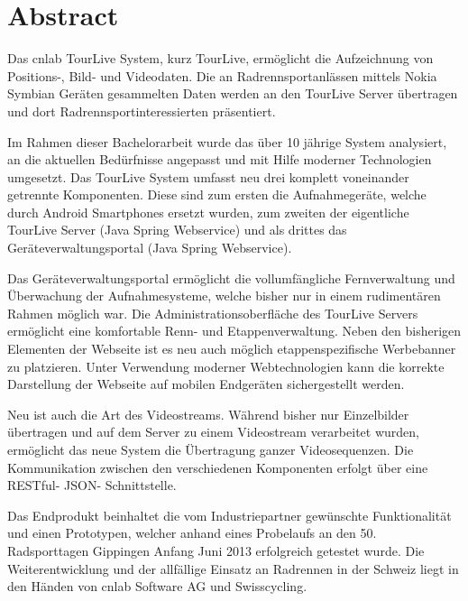 \chapter*{Abstract}
Das cnlab TourLive System, kurz TourLive, ermöglicht die Aufzeichnung von Positions-, Bild- und Videodaten. Die an Radrennsportanlässen mittels Nokia Symbian Geräten gesammelten Daten werden an den TourLive Server übertragen und dort Radrennsportinteressierten präsentiert.



Im Rahmen dieser Bachelorarbeit wurde das über 10 jährige System analysiert, an die aktuellen Bedürfnisse angepasst und mit Hilfe moderner Technologien umgesetzt. Das TourLive System umfasst neu drei komplett voneinander getrennte Komponenten. Diese sind zum ersten die Aufnahmegeräte, welche durch Android Smartphones ersetzt wurden, zum zweiten der eigentliche TourLive Server (Java Spring Webservice) und als drittes das Geräteverwaltungsportal (Java Spring Webservice). 


Das Geräteverwaltungsportal ermöglicht die vollumfängliche Fernverwaltung und Überwachung der Aufnahmesysteme, welche bisher nur in einem rudimentären Rahmen möglich war. Die Administrationsoberfläche des TourLive Servers ermöglicht eine komfortable Renn- und Etappenverwaltung. Neben den bisherigen Elementen der Webseite ist es neu auch möglich etappenspezifische Werbebanner zu platzieren. Unter Verwendung moderner Webtechnologien kann die korrekte Darstellung der Webseite auf mobilen Endgeräten sichergestellt werden.


Neu ist auch die Art des Videostreams. Während bisher nur Einzelbilder übertragen und auf dem Server zu einem Videostream verarbeitet wurden, ermöglicht das neue System die Übertragung ganzer Videosequenzen. Die Kommunikation zwischen den verschiedenen Komponenten erfolgt über eine RESTful- JSON- Schnittstelle. 


Das Endprodukt beinhaltet die vom Industriepartner gewünschte Funktionalität und einen Prototypen, welcher anhand eines Probelaufs an den 50. Radsporttagen Gippingen Anfang Juni 2013 erfolgreich getestet wurde. Die Weiterentwicklung und der allfällige Einsatz an Radrennen in der Schweiz liegt in den Händen von cnlab Software AG und Swisscycling.
